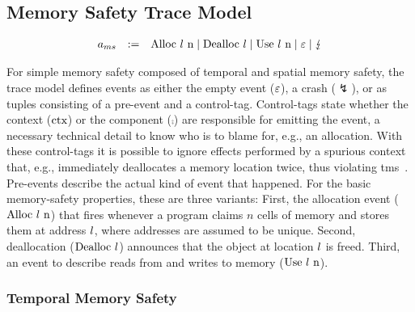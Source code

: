 \documentclass[dvipsnames,conference]{IEEEtran}
\theoremstyle{definition}
\begin{document}
\subsection{Memory Safety Trace Model}\label{subsec:basic:memsafety:tracemodel}

\vspace{-1.5em}

\[
  \begin{array}{rcll}
    \event[_{ms}] &:=& \ev{Alloc \loc\ n} \mid \ev{Dealloc \loc} \mid \ev{Use \loc\ n} \mid \emptyevent \mid \lightning \\ 
  \end{array}
\]

For simple memory safety composed of temporal and spatial memory safety, the trace model defines events as either the empty event ($\emptyevent$), a crash ($\lightning$), or as tuples consisting of a pre-event and a control-tag.
Control-tags state whether the context ($\ctx$) or the component ($\comp$) are responsible for emitting the event, a necessary technical detail to know who is to blame for, e.g., an allocation.
With these control-tags it is possible to ignore effects performed by a spurious context that, e.g., immediately deallocates a memory location twice, thus violating \gls*{tms}~\cite{nagarakatte2010cets}.
Pre-events describe the actual kind of event that happened.
For the basic memory-safety properties, these are three variants:
First, the allocation event ($\ev{Alloc\ \loc\ n}$) that fires whenever a program claims $n$ cells of memory and stores them at address $\loc$, where addresses are assumed to be unique.
Second, deallocation ($\ev{Dealloc\ \loc}$) announces that the object at location $\loc$ is freed.
Third, an event to describe reads from and writes to memory ($\ev{Use\ \loc\ n}$).

\subsubsection{Temporal Memory Safety}
\end{document}
